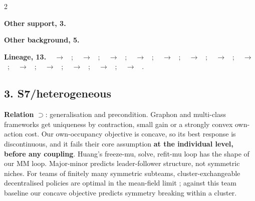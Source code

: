 \documentclass[10pt]{article}
\newcommand{\memb}[1]{\par\smallskip\textbf{#1}\quad}
\begin{document}
\begin{multicols}{2}
\memb{Other support, 3.} \citetext{\citealp{Tsetlin-goore73}\dag; \citealp{Andrew-goore86}; \citealp{TungKleinrock-using96}}

\memb{Other background, 5.} {\footnotesize \citetext{\citealp{Izquierdo-fast22}; \citealp{Paccagnan-utility22}\dag; \citealp{Oommen-using07}\dag; \citealp{GranmoGlimsdal-accelerated12}; \citealp{Ameri-cellular22}}}

\end{multicols}
\memb{Lineage, 13.} {\footnotesize \citeauthor{Tsetlin-goore73}~\citeyear{Tsetlin-goore73} $\to$ \citeauthor{Andrew-goore86}~\citeyear{Andrew-goore86}; \citeauthor{Tsetlin-goore73}~\citeyear{Tsetlin-goore73} $\to$ \citeauthor{TungKleinrock-using96}~\citeyear{TungKleinrock-using96}; \citeauthor{Young-evolution93}~\citeyear{Young-evolution93} $\to$ \citeauthor{PradelskiYoung-learning12}~\citeyear{PradelskiYoung-learning12}; \citeauthor{TungKleinrock-using96}~\citeyear{TungKleinrock-using96} $\to$ \citeauthor{Oommen-using07}~\citeyear{Oommen-using07}; \citeauthor{Oommen-using07}~\citeyear{Oommen-using07} $\to$ \citeauthor{GranmoGlimsdal-accelerated12}~\citeyear{GranmoGlimsdal-accelerated12}; \citeauthor{Marden-payoff09}~\citeyear{Marden-payoff09} $\to$ \citeauthor{Marden-achieving14}~\citeyear{Marden-achieving14}; \citeauthor{PradelskiYoung-learning12}~\citeyear{PradelskiYoung-learning12} $\to$ \citeauthor{Marden-achieving14}~\citeyear{Marden-achieving14}; \citeauthor{Marden-achieving14}~\citeyear{Marden-achieving14} $\to$ \citeauthor{Menon-convergence13}~\citeyear{Menon-convergence13}; \citeauthor{Marden-achieving14}~\citeyear{Marden-achieving14} $\to$ \citeauthor{Ramakrishnan-completely16}~\citeyear{Ramakrishnan-completely16}; \citeauthor{Marden-achieving14}~\citeyear{Marden-achieving14} $\to$ \citeauthor{Donmez-logitq25}~\citeyear{Donmez-logitq25}; \citeauthor{Marden-achieving14}~\citeyear{Marden-achieving14} $\to$ \citeauthor{Kiremitci-decentralized26}~\citeyear{Kiremitci-decentralized26}; \citeauthor{Borowski-learning15}~\citeyear{Borowski-learning15} $\to$ \citeauthor{Ramakrishnan-completely19}~\citeyear{Ramakrishnan-completely19}; \citeauthor{Ramakrishnan-completely16}~\citeyear{Ramakrishnan-completely16} $\to$ \citeauthor{Ramakrishnan-completely19}~\citeyear{Ramakrishnan-completely19}.}

\subsection{3. S7/heterogeneous}\label{node:S7-S7-heterogeneous}
\textbf{Relation} $\supset$: generalisation and precondition. Graphon and multi-class frameworks get uniqueness by contraction, small gain or a strongly convex own-action cost. Our own-occupancy objective is concave, so its best response is discontinuous, and it fails their core assumption \textbf{at the individual level, before any coupling}. Huang's freeze-mu, solve, refit-mu loop has the shape of our MM loop. Major-minor predicts leader-follower structure, not symmetric niches. For teams of finitely many symmetric subteams, cluster-exchangeable decentralised policies are optimal in the mean-field limit \citep{Braun-mean26}; against this team baseline our concave objective predicts symmetry breaking within a cluster.
\end{document}

